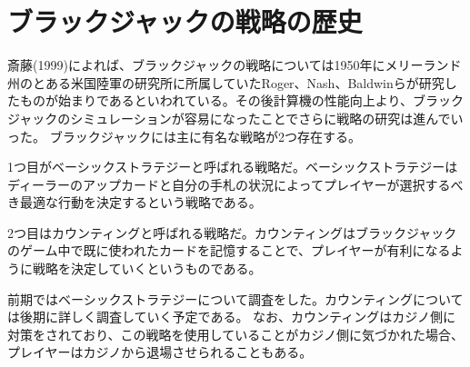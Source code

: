 
\section{ブラックジャックの戦略の歴史}
斎藤(1999)によれば、ブラックジャックの戦略については1950年にメリーランド州のとある米国陸軍の研究所に所属していたRoger、Nash、Baldwinらが研究したものが始まりであるといわれている。その後計算機の性能向上より、ブラックジャックのシミュレーションが容易になったことでさらに戦略の研究は進んでいった。
ブラックジャックには主に有名な戦略が2つ存在する。

1つ目がベーシックストラテジーと呼ばれる戦略だ。ベーシックストラテジーはディーラーのアップカードと自分の手札の状況によってプレイヤーが選択するべき最適な行動を決定するという戦略である。

2つ目はカウンティングと呼ばれる戦略だ。カウンティングはブラックジャックのゲーム中で既に使われたカードを記憶することで、プレイヤーが有利になるように戦略を決定していくというものである。

前期ではベーシックストラテジーについて調査をした。カウンティングについては後期に詳しく調査していく予定である。
なお、カウンティングはカジノ側に対策をされており、この戦略を使用していることがカジノ側に気づかれた場合、プレイヤーはカジノから退場させられることもある。
